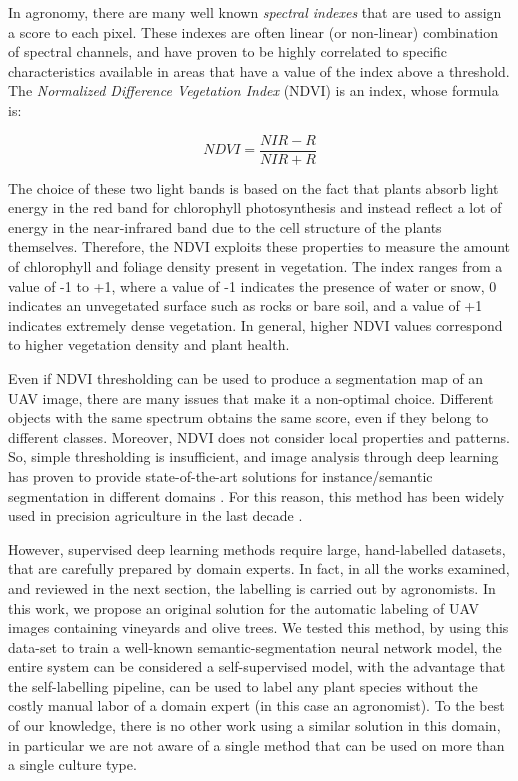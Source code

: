 \documentclass[comsoc,final]{IEEEtran}
\begin{document}
In agronomy, there are many well known \emph{spectral indexes} that are used to assign a score to each pixel. These indexes are often linear (or non-linear) combination of spectral channels, and have proven to be highly correlated to specific characteristics available in areas that have a value of the index above a threshold. The \emph{Normalized Difference Vegetation Index} (NDVI) is an index, whose formula is:

\[ NDVI = \frac{NIR-R}{NIR+R} \]

The choice of these two light bands is based on the fact that plants absorb light energy in the red band for chlorophyll photosynthesis and instead reflect a lot of energy in the near-infrared band due to the cell structure of the plants themselves. Therefore, the NDVI exploits these properties to measure the amount of chlorophyll and foliage density present in vegetation. The index ranges from a value of -1 to +1, where a value of -1 indicates the presence of water or snow, 0 indicates an unvegetated surface such as rocks or bare soil, and a value of +1 indicates extremely dense vegetation. In general, higher NDVI values correspond to higher vegetation density and plant health.

Even if NDVI thresholding can be used to produce a segmentation map of an UAV image, there are many issues that make it a non-optimal choice. Different objects with the same spectrum obtains the same score, even if they belong to different classes. Moreover, NDVI does not consider local properties and patterns. So, simple thresholding is insufficient, and image analysis through deep learning has proven to provide state-of-the-art solutions for instance/semantic segmentation in different domains \cite{moen_deep_2019,garcia-garcia_review_2017}. For this reason, this method has been widely used in precision agriculture in the last decade \cite{bouguettaya_deep_2022}.

However, supervised deep learning methods require large, hand-labelled datasets, that are carefully prepared by domain experts. In fact, in all the works examined, and reviewed in the next section, the labelling is carried out by agronomists. In this work, we propose an original solution for the automatic labeling of UAV images containing vineyards and olive trees. We tested this method, by using this data-set to train a well-known semantic-segmentation neural network model, the entire system can be considered a self-supervised model, with the advantage that the self-labelling pipeline, can be used to label any plant species without the costly manual labor of a domain expert (in this case an agronomist). To the best of our knowledge, there is no other work using a similar solution in this domain, in particular we are not aware of a single method that can be used on more than a single culture type. 
\end{document}
